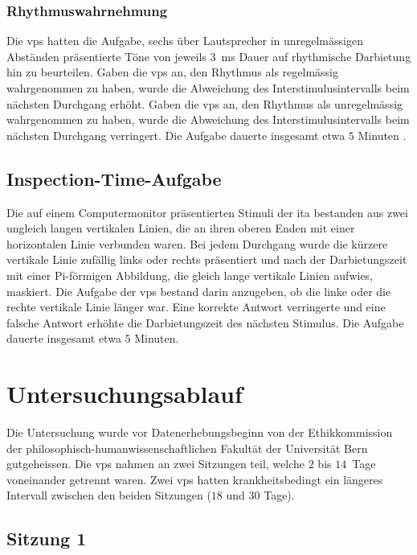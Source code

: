 \documentclass[11pt, twoside, a4paper]{book}		%
\begin{document}
\subsubsection*{Rhythmuswahrnehmung}
Die \glspl{vp} hatten die Aufgabe, sechs über Lautsprecher in unregelmässigen Abständen präsentierte Töne von jeweils $3$~ms Dauer auf rhythmische Darbietung hin zu beurteilen. 
Gaben die \glspl{vp} an, den Rhythmus als regelmässig wahrgenommen zu haben, wurde die Abweichung des Interstimulusintervalls beim nächsten Durchgang erhöht. Gaben die \glspl{vp} an, den Rhythmus als unregelmässig wahrgenommen zu haben, wurde die Abweichung des Interstimulusintervalls beim nächsten Durchgang verringert.
Die Aufgabe dauerte insgesamt etwa $5$ Minuten \citep[siehe][]{Stauffer2012}.

\subsection{Inspection-Time-Aufgabe}

Die auf einem Computermonitor präsentierten Stimuli der \gls{ita} \citep{Vickers1972} bestanden aus zwei ungleich langen vertikalen Linien, die an ihren oberen Enden mit einer horizontalen Linie verbunden waren. Bei jedem Durchgang wurde die kürzere vertikale Linie zufällig links oder rechts präsentiert und nach der Darbietungszeit mit einer Pi-förmigen Abbildung, die gleich lange vertikale Linien aufwies, maskiert. Die Aufgabe der \glspl{vp} bestand darin anzugeben, ob die linke oder die rechte vertikale Linie länger war. Eine korrekte Antwort verringerte und eine falsche Antwort erhöhte die Darbietungszeit des nächsten Stimulus. Die Aufgabe dauerte insgesamt etwa $5$ Minuten.

\section{Untersuchungsablauf \label{sec:Versuchsablauf}}

Die Untersuchung wurde vor Datenerhebungsbeginn von der Ethikkommission der philosophisch-humanwissenschaftlichen Fakultät der Universität Bern gutgeheissen. Die \glspl{vp} nahmen an zwei Sitzungen teil, welche $2$ bis $14$~Tage voneinander getrennt waren. Zwei \glspl{vp} hatten krankheitsbedingt ein längeres Intervall zwischen den beiden Sitzungen ($18$ und $30$ Tage).

\subsection{Sitzung 1}
\end{document}
